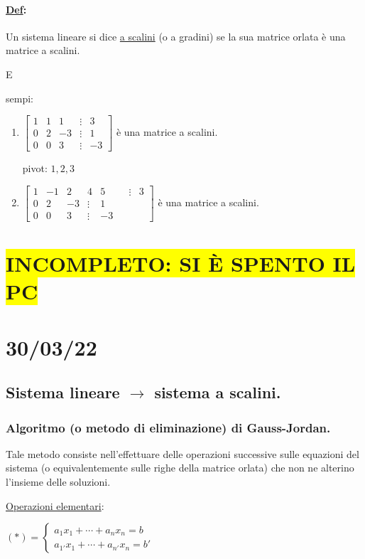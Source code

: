 \documentclass{article}
\newcommand{\hl}[1]{\colorbox{yellow}{#1}}
\newcommand{\ul}[1]{\underline{#1}}
\newcommand{\Def}[2]{\paragraph{\ul{Def}:}#1\\\hspace*{3em}\begin{minipage}{.8\textwidth}#2\end{minipage}}
\begin{document}
\Def{ Un sistema lineare si dice \ul{a scalini} (o a gradini) se la sua matrice orlata è una matrice a scalini.}

Esempi:
\begin{enumerate}
	\item $\begin{bmatrix}
			1 & 1 & 1  & \vdots & 3  \\
			0 & 2 & -3 & \vdots & 1  \\
			0 & 0 & 3  & \vdots & -3
		\end{bmatrix}$ è una matrice a scalini.

	  pivot: $1,2,3$
	\item $\begin{bmatrix}
			1 & -1 & 2  & 4      & 5  &  & \vdots & 3 \\
			0 & 2  & -3 & \vdots & 1                  \\
			0 & 0  & 3  & \vdots & -3
		\end{bmatrix}$ è una matrice a scalini.
\end{enumerate}
\section*{\hl{INCOMPLETO: SI È SPENTO IL PC}}
\section{30/03/22}
\subsection{Sistema lineare $\longrightarrow$ sistema a scalini.}
\subsubsection*{Algoritmo (o metodo di eliminazione) di Gauss-Jordan.}
Tale metodo consiste nell'effettuare delle operazioni successive sulle equazioni del sistema (o equivalentemente sulle righe della matrice orlata) che non ne alterino l'insieme delle soluzioni.

\ul{Operazioni elementari}:

$(*)=\begin{cases}
	a_1x_1+\cdots+a_nx_n=b \\
	a_{1'}x_1+\cdots+a_{n'}x_n=b'
\end{cases}$
\end{document}
